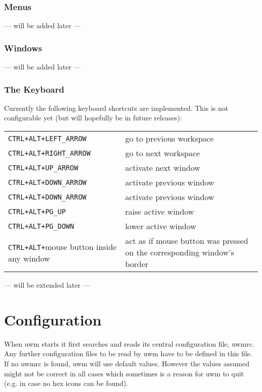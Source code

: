 \documentclass[10pt,a4paper]{article}
\newcommand{\uwm}{{\sc uwm} }
\begin{document}
\section{Menus}
\begin{center} --- will be added later --- \end{center}
\section{Windows}
\begin{center} --- will be added later --- \end{center}
\section{The Keyboard}
Currently the following keyboard shortcuts are implemented. This is not configurable yet (but will hopefully be in future releases):

\begin{tabular}{p{4cm}p{8cm}}
\texttt{CTRL+ALT+LEFT\_ARROW} & go to previous workspace\\
\texttt{CTRL+ALT+RIGHT\_ARROW} & go to next workspace\\
\texttt{CTRL+ALT+UP\_ARROW} & activate next window\\
\texttt{CTRL+ALT+DOWN\_ARROW} & activate previous window\\
\texttt{CTRL+ALT+DOWN\_ARROW} & activate previous window\\
\texttt{CTRL+ALT+PG\_UP} & raise active window\\
\texttt{CTRL+ALT+PG\_DOWN} & lower active window\\
\texttt{CTRL+ALT+}mouse button inside any window & act as if mouse button was pressed on the corresponding window's border
\end{tabular}

\begin{center} --- will be extended later --- \end{center}

\part{Configuration}\label{Configuration}
When \uwm starts it first searches and reads its central configuration file,
\textrm{uwmrc}. Any further configuration files to be read by \uwm have to be
defined in this file. If no \textsf{uwmrc} is found, \uwm will use
default values. However the values assumed might not be correct in all cases
which sometimes is a reason for uwm to quit (e.g. in case no hex icons can be
found).
\end{document}
